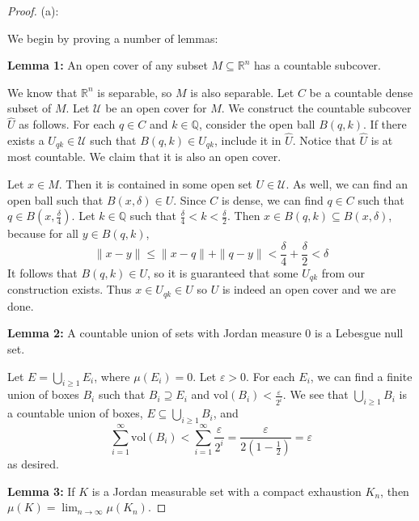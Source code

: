 \documentclass{article}
\newcommand{\vol}{\mathrm{vol}}
\theoremstyle{plain} %
\numberwithin{thm}{section} %
\theoremstyle{definition}
\begin{document}
        \begin{proof}
            (a):

            We begin by proving a number of lemmas:

            \textbf{Lemma 1:} An open cover of any subset \(M \subseteq \mathbb{R}^n\) has a countable subcover.

            We know that \(\mathbb{R}^n\) is separable, so \(M\) is also separable. Let \(C\) be a countable dense subset of \(M\). Let \(\mathcal{U}\) be an open cover for \(M\). We construct the countable subcover \(\hat{U}\) as follows. For each \(q \in C\) and \(k \in \mathbb{Q}\), consider the open ball \(B(q, k)\). If there exists a \(U_{qk} \in \mathcal{U}\) such that \(B(q , k) \in U_{qk}\), include it in \(\hat{U}\). Notice that \(\hat{U}\) is at most countable. We claim that it is also an open cover.

            Let \(x \in M\). Then it is contained in some open set \(U \in \mathcal{U}\). As well, we can find an open ball such that \(B(x, \delta) \in U\). Since \(C\) is dense, we can find \(q \in C\) such that \(q \in B(x, \frac{\delta}{4})\). Let \(k \in \mathbb{Q}\) such that \(\frac{\delta}{4} < k < \frac{\delta}{2}\). Then \(x \in B(q, k) \subseteq B(x, \delta)\), because for all \(y \in B(q,k)\),
            \[
                \|x - y\| \leq \|x - q\| + \|q - y\| < \frac{\delta}{4} + \frac{\delta}{2} < \delta
            \]
            It follows that \(B(q,k) \in U\), so it is guaranteed that some \(U_{qk}\) from our construction exists. Thus \(x \in U_{qk} \in U\) so \(U\) is indeed an open cover and we are done.

            \medskip

            \textbf{Lemma 2:} A countable union of sets with Jordan measure 0 is a Lebesgue null set.

            Let \(E = \bigcup_{i \geq 1} E_i\), where \(\mu (E_i) = 0\). Let \(\varepsilon > 0\). For each \(E_i\), we can find a finite union of boxes \(B_i\) such that \(B_i \supseteq E_i\) and \(\vol (B_i) < \frac{\varepsilon}{2^i}\). We see that \(\bigcup_{i\geq1}B_i\) is a countable union of boxes, \(E \subseteq \bigcup_{i\geq1}B_i\), and
            \[
                \sum_{i = 1}^{\infty} \vol (B_i) < \sum_{i=1}^{\infty} \frac{\varepsilon}{2^i} = \frac{\varepsilon}{2(1 - \frac{1}{2})} = \varepsilon
            \]
            as desired.

            \medskip

            \textbf{Lemma 3:} If \(K\) is a Jordan measurable set with a compact exhaustion \(K_n\), then \(\mu (K) = \lim_{n \to \infty} \mu (K_n)\).


\end{proof}
\end{document}
